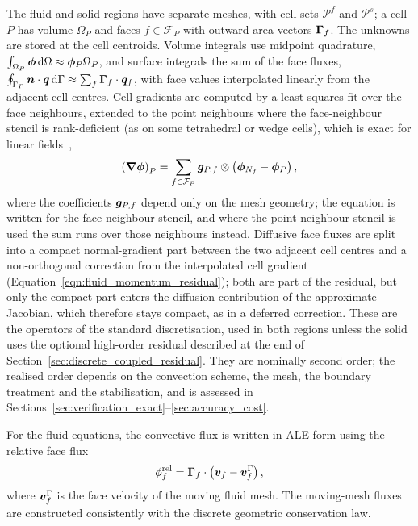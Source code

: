 The fluid and solid regions have separate meshes, with cell sets $\mathcal{P}^f$ and $\mathcal{P}^s$; a cell $P$ has volume $\Omega_P$ and faces $f \in \mathcal{F}_P$ with outward area vectors $\boldsymbol{\Gamma}_f$.
The unknowns are stored at the cell centroids.
Volume integrals use midpoint quadrature, $\int_{\Omega_P}\boldsymbol{\phi}\,\text{d}\Omega \approx \boldsymbol{\phi}_P\Omega_P$, and surface integrals the sum of the face fluxes, $\oint_{\Gamma_P}\boldsymbol{n}\cdot\boldsymbol{q}\,\text{d}\Gamma \approx \sum_{f}\boldsymbol{\Gamma}_f\cdot\boldsymbol{q}_f$, with face values interpolated linearly from the adjacent cell centres.
Cell gradients are computed by a least-squares fit over the face neighbours, extended to the point neighbours where the face-neighbour stencil is rank-deficient (as on some tetrahedral or wedge cells), which is exact for linear fields~\citep{Cardiff2026},
\begin{equation}
    \left( \boldsymbol{\nabla} \boldsymbol{\phi} \right)_P
    =
    \sum_{f \in \mathcal{F}_P}
    \boldsymbol{g}_{P,f} \otimes \left( \boldsymbol{\phi}_{N_f} - \boldsymbol{\phi}_{P} \right),
    \label{eqn:least_squares_gradient}
\end{equation}
where the coefficients $\boldsymbol{g}_{P,f}$ depend only on the mesh geometry; the equation is written for the face-neighbour stencil, and where the point-neighbour stencil is used the sum runs over those neighbours instead.
Diffusive face fluxes are split into a compact normal-gradient part between the two adjacent cell centres and a non-orthogonal correction from the interpolated cell gradient (Equation~\eqref{eqn:fluid_momentum_residual}); both are part of the residual, but only the compact part enters the diffusion contribution of the approximate Jacobian, which therefore stays compact, as in a deferred correction.
These are the operators of the standard discretisation, used in both regions unless the solid uses the optional high-order residual described at the end of Section~\ref{sec:discrete_coupled_residual}.
They are nominally second order; the realised order depends on the convection scheme, the mesh, the boundary treatment and the stabilisation, and is assessed in Sections~\ref{sec:verification_exact}--\ref{sec:accuracy_cost}.

For the fluid equations, the convective flux is written in ALE form using the relative face flux
\begin{equation}
    \phi_f^\mathrm{rel}
    =
    \boldsymbol{\Gamma}_f
    \cdot
    \left(
    \boldsymbol{v}_f
    -
    \boldsymbol{v}^{\Gamma}_f
    \right),
    \label{eqn:relative_flux}
\end{equation}
where $\boldsymbol{v}^{\Gamma}_f$ is the face velocity of the moving fluid mesh. The
moving-mesh fluxes are constructed consistently with the discrete geometric
conservation law.


